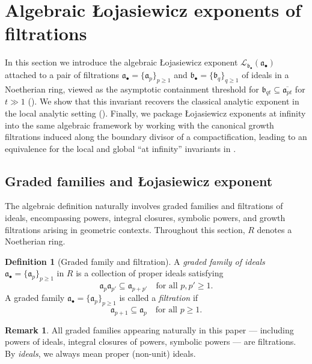 \documentclass[12pt]{amsart}
\renewcommand{\a}{\mathfrak{a}}
\renewcommand{\b}{\mathfrak{b}}
\newcommand{\Loj}{\mathcal{L}} %
\newcommand{\abul}{{\a_\bullet}}
\newcommand{\bbul}{{\b_\bullet}}
\theoremstyle{plain}
\theoremstyle{definition}
\newtheorem{definition}[theorem]{Definition}
\newtheorem{remark}[theorem]{Remark}
\numberwithin{equation}{section}
\begin{document}
\section{Algebraic \L ojasiewicz exponents of filtrations} \label{sec:algebraicDef}

In this section we introduce the algebraic \L{}ojasiewicz exponent $\Loj_{\bbul}(\abul)$ attached to a pair of filtrations $\abul=\{\a_p\}_{p\ge1}$ and $\bbul=\{\b_q\}_{q\ge1}$ of ideals in a Noetherian ring, viewed as the asymptotic containment threshold for $\b_{qt}\subseteq \overline{\a_{pt}}$ for $t\gg 1$ ().  We show that this invariant recovers the classical analytic exponent in the local analytic setting ().  Finally, we package \L{}ojasiewicz exponents at infinity into the same algebraic framework by working with the canonical growth filtrations induced along the boundary divisor of a compactification, leading to an equivalence for the local and global “at infinity” invariants in .

\subsection{Graded families and \L ojasiewicz exponent} 
The algebraic definition naturally involves graded families and filtrations of
ideals, encompassing powers, integral closures, symbolic powers, and growth
filtrations arising in geometric contexts. Throughout this section, $R$ denotes a Noetherian ring.


\begin{definition}[Graded family and filtration]\label{def:graded-family}
	A \emph{graded family of ideals} $\abul=\{\a_p\}_{p\ge1}$ in $R$ is a collection of proper ideals
	satisfying
	\[
	\a_p\a_{p'}\subseteq \a_{p+p'} \quad \text{for all } p,p'\ge1.
	\]
A graded family $\abul=\{\a_p\}_{p\ge1}$ is called a \emph{filtration} if
	\[
	\a_{p+1}\subseteq \a_p \quad \text{for all } p\ge1.
	\]
\end{definition}

\begin{remark}\label{rem:monotone}
	All graded families appearing naturally in this paper — including powers of ideals,
	integral closures of powers, symbolic powers — are filtrations. By \emph{ideals}, we always mean proper (non-unit) ideals.
\end{remark}
\end{document}
